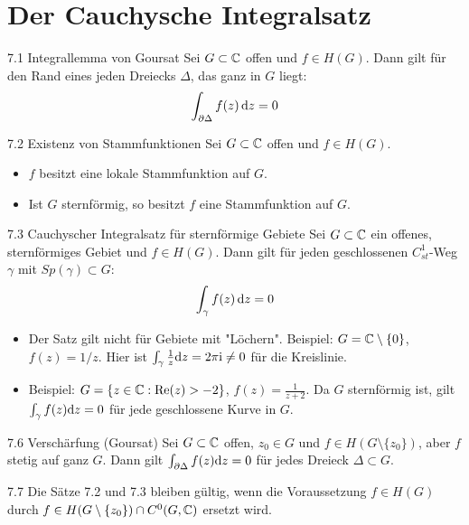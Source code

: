 \section{Der Cauchysche Integralsatz}

\begin{satz}{7.1 Integrallemma von Goursat}
Sei $G \subset \mathbb{C}$ offen und $f \in H(G)$. Dann gilt für den Rand eines jeden Dreiecks $\Delta$, das ganz in $G$ liegt:
\[
    \int_{\partial \Delta} f(z) \, \mathrm{d}z = 0
\]
\end{satz}

\begin{satz}{7.2 Existenz von Stammfunktionen}
Sei $G \subset \mathbb{C}$ offen und $f \in H(G)$.
\begin{itemize}
    \item[i)] $f$ besitzt eine lokale Stammfunktion auf $G$.
    \item[ii)] Ist $G$ sternförmig, so besitzt $f$ eine Stammfunktion auf $G$.
\end{itemize}
\end{satz}

\begin{satz}{7.3 Cauchyscher Integralsatz für sternförmige Gebiete}
Sei $G \subset \mathbb{C}$ ein offenes, sternförmiges Gebiet und $f \in H(G)$. Dann gilt für jeden geschlossenen $C_{st}^1$-Weg $\gamma$ mit $Sp(\gamma) \subset G$:
\[
    \int_\gamma f(z) \, \mathrm{d}z = 0
\]
\end{satz}

\begin{tcolorbox}[colback=yellow!5!white, colframe=yellow!60!black, title={Bemerkung 7.4 \& 7.5}]
\begin{itemize}
    \item[7.4] Der Satz gilt nicht für Gebiete mit "Löchern". Beispiel: $G = \mathbb{C} \setminus \{0\}$, $f(z) = 1/z$. Hier ist $\int_\gamma \frac{1}{z} \mathrm{d}z = 2\pi\mathrm{i} \neq 0$ für die Kreislinie.
    \item[7.5] Beispiel: $G = \{z \in \mathbb{C} : \operatorname{Re}(z) > -2\}$, $f(z) = \frac{1}{z+2}$. Da $G$ sternförmig ist, gilt $\int_\gamma f(z) \mathrm{d}z = 0$ für jede geschlossene Kurve in $G$.
\end{itemize}
\end{tcolorbox}

\begin{satz}{7.6 Verschärfung (Goursat)}
Sei $G \subset \mathbb{C}$ offen, $z_0 \in G$ und $f \in H(G \setminus \{z_0\})$, aber $f$ stetig auf ganz $G$. Dann gilt $\int_{\partial \Delta} f(z) \mathrm{d}z = 0$ für jedes Dreieck $\Delta \subset G$.
\end{satz}

\begin{satz}{7.7}
Die Sätze 7.2 und 7.3 bleiben gültig, wenn die Voraussetzung $f \in H(G)$ durch $f \in H(G \setminus \{z_0\}) \cap C^0(G, \mathbb{C})$ ersetzt wird.
\end{satz}